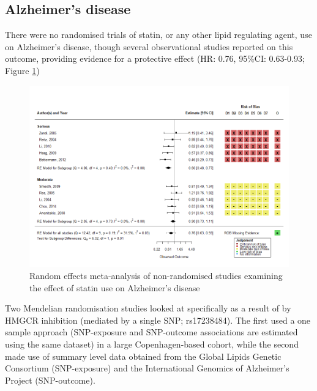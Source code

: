 \documentclass[a4paper, twoside]{templates/ociamthesis}
\begin{document}
\hypertarget{alzheimers-disease}{%
\subsection{Alzheimer's disease}\label{alzheimers-disease}}

There were no randomised trials of statin, or any other lipid regulating agent, use on Alzheimer's disease, though several observational studies reported on this outcome, providing evidence for a protective effect (HR: 0.76, 95\%CI: 0.63-0.93; Figure \ref{fig:obsStatinADFig})





\begin{figure}[H]
\includegraphics[width=1\linewidth]{figures/sys-rev/fp_obs_Statin-Ever_AD} \caption[Random effects meta-analysis of statins on Alzheimer's disease]{Random effects meta-analysis of non-randomised studies examining the effect of statin use on Alzheimer's disease}\label{fig:obsStatinADFig}
\end{figure}

Two Mendelian randomisation studies looked at specifically as a result of by HMGCR inhibition (mediated by a single SNP; rs17238484). The first used a one sample approach (SNP-exposure and SNP-outcome associations are estimated using the same dataset) in a large Copenhagen-based cohort, while the second made use of summary level data obtained from the Global Lipids Genetic Consortium (SNP-exposure) and the International Genomics of Alzheimer's Project (SNP-outcome).
\end{document}
